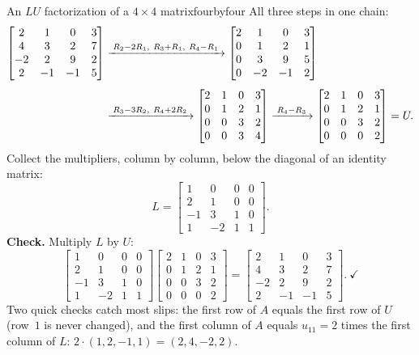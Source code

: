 \documentclass[11pt]{article}
\begin{document}
\begin{exmp}{An $LU$ factorization of a $4\times4$ matrix}{fourbyfour}
All three steps in one chain:
\begin{align*}
\begin{bmatrix}2&1&0&3\\4&3&2&7\\-2&2&9&2\\2&-1&-1&5\end{bmatrix}
&\xrightarrow{\;R_2-2R_1,\ R_3+R_1,\ R_4-R_1\;}
\begin{bmatrix}2&1&0&3\\0&1&2&1\\0&3&9&5\\0&-2&-1&2\end{bmatrix}\\[4pt]
&\xrightarrow{\;R_3-3R_2,\ R_4+2R_2\;}
\begin{bmatrix}2&1&0&3\\0&1&2&1\\0&0&3&2\\0&0&3&4\end{bmatrix}
\xrightarrow{\;R_4-R_3\;}
\begin{bmatrix}2&1&0&3\\0&1&2&1\\0&0&3&2\\0&0&0&2\end{bmatrix}=U .
\end{align*}
Collect the multipliers, column by column, below the diagonal of an identity matrix:
\[
L=\begin{bmatrix}1&0&0&0\\2&1&0&0\\-1&3&1&0\\1&-2&1&1\end{bmatrix}.
\]
\textbf{Check.} Multiply $L$ by $U$:
\[
\begin{bmatrix}1&0&0&0\\2&1&0&0\\-1&3&1&0\\1&-2&1&1\end{bmatrix}
\begin{bmatrix}2&1&0&3\\0&1&2&1\\0&0&3&2\\0&0&0&2\end{bmatrix}
=\begin{bmatrix}2&1&0&3\\4&3&2&7\\-2&2&9&2\\2&-1&-1&5\end{bmatrix}.\ \checkmark
\]
Two quick checks catch most slips: the first row of $A$ equals the first row of $U$ (row~$1$ is never changed), and the first column of $A$ equals $u_{11}=2$ times the first column of $L$: $2\cdot(1,2,-1,1)=(2,4,-2,2)$.
\end{exmp}
\end{document}
